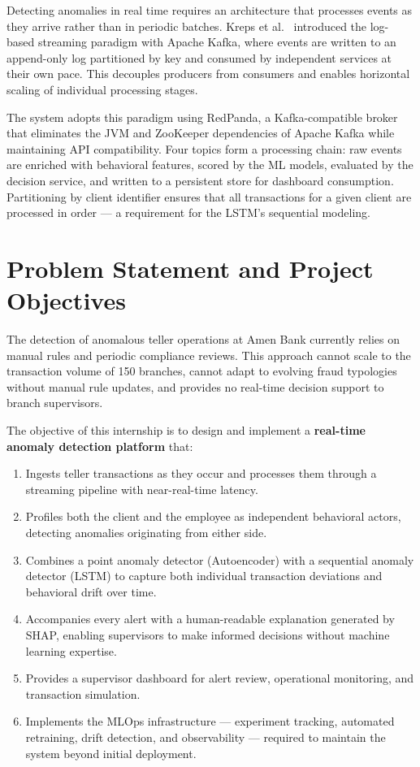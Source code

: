 Detecting anomalies in real time requires an architecture that
processes events as they arrive rather than in periodic batches.
Kreps et al.~\cite{kreps2011} introduced the log-based streaming
paradigm with Apache Kafka, where events are written to an
append-only log partitioned by key and consumed by independent
services at their own pace. This decouples producers from consumers
and enables horizontal scaling of individual processing stages.

The system adopts this paradigm using RedPanda, a Kafka-compatible
broker that eliminates the JVM and ZooKeeper dependencies of Apache
Kafka while maintaining API compatibility. Four topics form a
processing chain: raw events are enriched with behavioral features,
scored by the ML models, evaluated by the decision service, and
written to a persistent store for dashboard consumption. Partitioning
by client identifier ensures that all transactions for a given client
are processed in order --- a requirement for the LSTM's sequential
modeling.


\section{Problem Statement and Project Objectives}
\label{sec:problem-statement}

The detection of anomalous teller operations at Amen Bank currently
relies on manual rules and periodic compliance reviews. This approach
cannot scale to the transaction volume of 150 branches, cannot adapt to
evolving fraud typologies without manual rule updates, and provides no
real-time decision support to branch supervisors.

The objective of this internship is to design and implement a
\textbf{real-time anomaly detection platform} that:

\begin{enumerate}
    \item Ingests teller transactions as they occur and processes them
          through a streaming pipeline with near-real-time latency.
    \item Profiles both the client and the employee as independent
          behavioral actors, detecting anomalies originating from
          either side.
    \item Combines a point anomaly detector (Autoencoder) with a
          sequential anomaly detector (LSTM) to capture both individual
          transaction deviations and behavioral drift over time.
    \item Accompanies every alert with a human-readable explanation
          generated by SHAP, enabling supervisors to make informed
          decisions without machine learning expertise.
    \item Provides a supervisor dashboard for alert review, operational
          monitoring, and transaction simulation.
    \item Implements the MLOps infrastructure --- experiment tracking,
          automated retraining, drift detection, and observability ---
          required to maintain the system beyond initial deployment.
\end{enumerate}